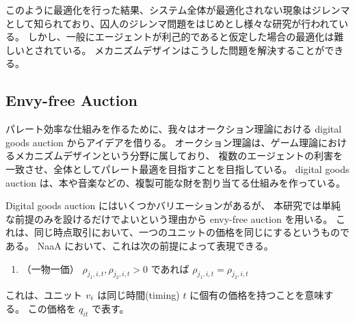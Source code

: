 このように最適化を行った結果、システム全体が最適化されない現象はジレンマとして知られており、囚人のジレンマ問題をはじめとし様々な研究が行われている。
しかし、一般にエージェントが利己的であると仮定した場合の最適化は難しいとされている。
メカニズムデザインはこうした問題を解決することができる。

%




\subsection{Envy-free Auction}
パレート効率な仕組みを作るために、我々はオークション理論における digital goods auction からアイデアを借りる。
オークション理論は、ゲーム理論におけるメカニズムデザインという分野に属しており、
複数のエージェントの利害を一致させ、全体としてパレート最適を目指すことを目指している。
digital goods auction は、本や音楽などの、複製可能な財を割り当てる仕組みを作っている。

Digital goods auction にはいくつかバリエーションがあるが、
本研究では単純な前提のみを設けるだけでよいという理由から envy-free auction \citep{guruswami2005profit} を用いる。
これは、同じ時点取引において、一つのユニットの価格を同じにするというものである。
NaaA において、これは次の前提によって表現できる。
\begin{enumerate}
\renewcommand{\labelenumi}{N\arabic{enumi}:}
\setcounter{enumi}{4}
\item （一物一価）
	$\rho_{j_1,i,t}, \rho_{j_2,i,t} > 0$ であれば $\rho_{j_1,i,t} = \rho_{j_2,i,t}$ 
\end{enumerate}
これは、ユニット $v_{i}$ は同じ時間(timing) $t$ に個有の価格を持つことを意味する。
この価格を $q_{it}$ で表す。

